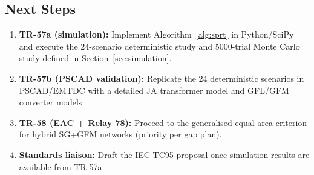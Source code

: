 \documentclass[11pt, a4paper]{article}
\begin{document}
\subsection{Next Steps}

\begin{enumerate}
  \item \textbf{TR-57a (simulation):} Implement Algorithm~\ref{alg:sprt} in
    Python/SciPy and execute the 24-scenario deterministic study and
    5000-trial Monte Carlo study defined in Section~\ref{sec:simulation}.
  \item \textbf{TR-57b (PSCAD validation):} Replicate the 24 deterministic
    scenarios in PSCAD/EMTDC with a detailed JA transformer model and
    GFL/GFM converter models.
  \item \textbf{TR-58 (EAC + Relay 78):} Proceed to the generalised
    equal-area criterion for hybrid SG+GFM networks (priority per gap plan).
  \item \textbf{Standards liaison:} Draft the IEC TC95 proposal once
    simulation results are available from TR-57a.
\end{enumerate}



\end{document}
